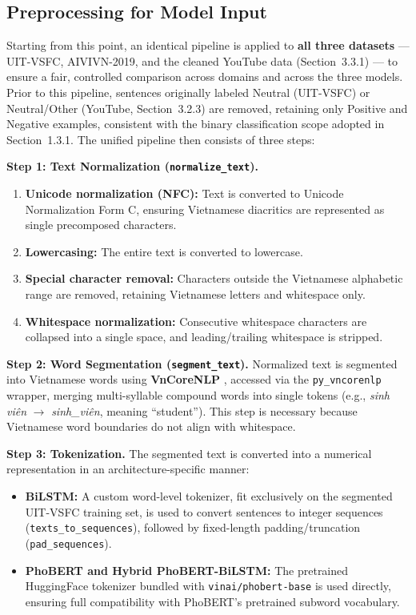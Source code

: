 \documentclass[12pt]{report} %
\begin{document}
\subsection{Preprocessing for Model Input}

Starting from this point, an identical pipeline is applied to \textbf{all three datasets} --- UIT-VSFC, AIVIVN-2019, and the cleaned YouTube data (Section~3.3.1) --- to ensure a fair, controlled comparison across domains and across the three models. Prior to this pipeline, sentences originally labeled Neutral (UIT-VSFC) or Neutral/Other (YouTube, Section~3.2.3) are removed, retaining only Positive and Negative examples, consistent with the binary classification scope adopted in Section~1.3.1. The unified pipeline then consists of three steps:

\textbf{Step 1: Text Normalization (\texttt{normalize\_text}).}
\begin{enumerate}
    \item \textbf{Unicode normalization (NFC):} Text is converted to Unicode Normalization Form C, ensuring Vietnamese diacritics are represented as single precomposed characters.
    \item \textbf{Lowercasing:} The entire text is converted to lowercase.
    \item \textbf{Special character removal:} Characters outside the Vietnamese alphabetic range are removed, retaining Vietnamese letters and whitespace only.
    \item \textbf{Whitespace normalization:} Consecutive whitespace characters are collapsed into a single space, and leading/trailing whitespace is stripped.
\end{enumerate}

\textbf{Step 2: Word Segmentation (\texttt{segment\_text}).} Normalized text is segmented into Vietnamese words using \textbf{VnCoreNLP} \cite{vu2018vncorenlp}, accessed via the \texttt{py\_vncorenlp} wrapper, merging multi-syllable compound words into single tokens (e.g., \textit{sinh viên} $\rightarrow$ \textit{sinh\_viên}, meaning ``student''). This step is necessary because Vietnamese word boundaries do not align with whitespace.

\textbf{Step 3: Tokenization.} The segmented text is converted into a numerical representation in an architecture-specific manner:
\begin{itemize}
    \item \textbf{BiLSTM:} A custom word-level tokenizer, fit exclusively on the segmented UIT-VSFC training set, is used to convert sentences to integer sequences (\texttt{texts\_to\_sequences}), followed by fixed-length padding/truncation (\texttt{pad\_sequences}).
    \item \textbf{PhoBERT and Hybrid PhoBERT-BiLSTM:} The pretrained HuggingFace tokenizer bundled with \texttt{vinai/phobert-base} \cite{nguyen2020phobertpretrainedlanguagemodels} is used directly, ensuring full compatibility with PhoBERT's pretrained subword vocabulary.
\end{itemize}
\end{document}
